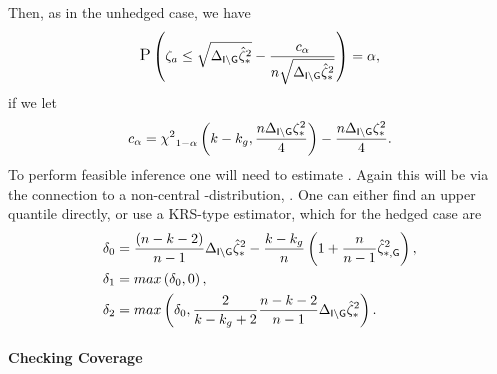 \documentclass[10pt,a4paper,english]{article}
\theoremstyle{plain}
\theoremstyle{definition}
\newtheorem{example}{Example}[section]
\theoremstyle{remark}
\providecommand{\cono}[1][\typeI]{\mathSUB{c}{#1}}
\providecommand{\dftwo}{\ssiz-\nstrat}
\begin{document}
Then, as in the unhedged case, we have
\begin{equation}
  \Pr{\psnr[a] \le \sqrt{\Hejssrsqopt{\hejG}} - \frac{\cono[{\typeI}]}{\ssiz\sqrt{\Hejssrsqopt{\hejG}}}} = \typeI,
\end{equation}
if we let
$$
\cono[\typeI] = {\chisqqnt{1-\typeI}{\nstrat - \nstrathej, \frac{\ssiz\Hejpsnrsqopt{\hejG}}{4}} - \frac{\ssiz\Hejpsnrsqopt{\hejG}}{4}}.
$$
To perform feasible inference one will need to estimate \Hejpsnrsqopt{\hejG}. 
Again this will be via the connection to a non-central \flaw{}-distribution, .
One can either find an upper quantile directly, or use a KRS-type estimator, which 
for the hedged case are 
\begin{equation}
\label{eqn:hedged_KRS_estimators}
\begin{split}
  \delta_0 &= \frac{\wrapParens{\dftwo-2}}{\ssiz-1}\Hejssrsqopt{\hejG} - \frac{\nstrat-\nstrathej}{\ssiz}\wrapParens{1 +
  \frac{\ssiz}{\ssiz-1}\ssrsqoptG{\hejG}},\\
	\delta_1 &= \fmax{\delta_0,0},\\
  \delta_2 &= \fmax{\delta_0,\frac{2}{\nstrat-\nstrathej+2}\frac{\dftwo-2}{\ssiz-1}\Hejssrsqopt{\hejG}}.
\end{split}
\end{equation}

\paragraph{Checking Coverage}

\end{document}
